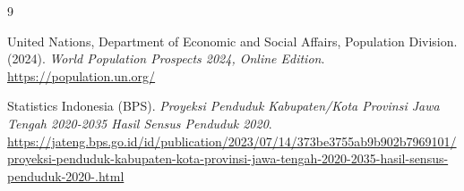 \documentclass[11pt, a4paper, twocolumn]{article}
\begin{document}
\begin{thebibliography}{9}

United Nations, Department of Economic and Social Affairs, Population Division. (2024). \textit{World Population Prospects 2024, Online Edition}. \url{https://population.un.org/}

Statistics Indonesia (BPS). \textit{Proyeksi Penduduk Kabupaten/Kota Provinsi Jawa Tengah 2020-2035 Hasil Sensus Penduduk 2020}. \url{https://jateng.bps.go.id/id/publication/2023/07/14/373be3755ab9b902b7969101/proyeksi-penduduk-kabupaten-kota-provinsi-jawa-tengah-2020-2035-hasil-sensus-penduduk-2020-.html}

\end{thebibliography}
\end{document}
